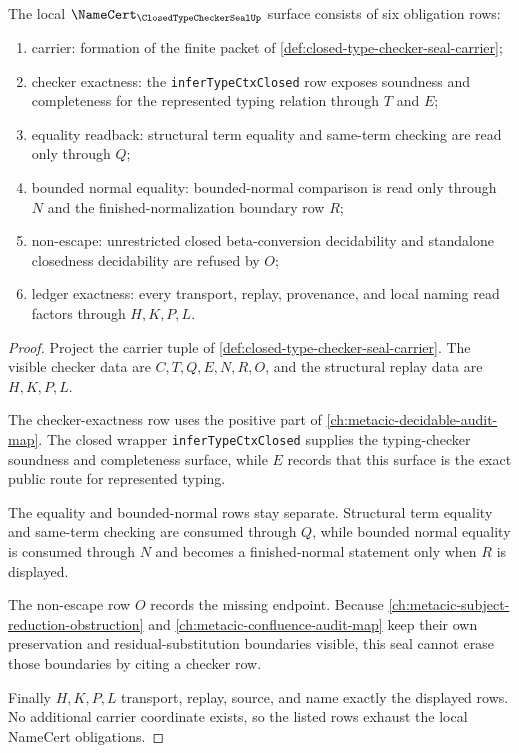 \begin{theorem}
\label{thm:closed-type-checker-seal-namecert-obligations}
The local $\NameCert_{\ClosedTypeCheckerSealUp}$ surface consists of six obligation rows:
\begin{enumerate}
\item carrier: formation of the finite packet of \autoref{def:closed-type-checker-seal-carrier};
\item checker exactness: the \texttt{inferTypeCtxClosed} row exposes soundness and completeness for the represented typing relation through $T$ and $E$;
\item equality readback: structural term equality and same-term checking are read only through $Q$;
\item bounded normal equality: bounded-normal comparison is read only through $N$ and the finished-normalization boundary row $R$;
\item non-escape: unrestricted closed beta-conversion decidability and standalone closedness decidability are refused by $O$;
\item ledger exactness: every transport, replay, provenance, and local naming read factors through $H,K,P,L$.
\end{enumerate}
\end{theorem}
\begin{proof}
Project the carrier tuple of \autoref{def:closed-type-checker-seal-carrier}. The visible checker data are $C,T,Q,E,N,R,O$, and the structural replay data are $H,K,P,L$.

The checker-exactness row uses the positive part of \autoref{ch:metacic-decidable-audit-map}. The closed wrapper \texttt{inferTypeCtxClosed} supplies the typing-checker soundness and completeness surface, while $E$ records that this surface is the exact public route for represented typing.

The equality and bounded-normal rows stay separate. Structural term equality and same-term checking are consumed through $Q$, while bounded normal equality is consumed through $N$ and becomes a finished-normal statement only when $R$ is displayed.

The non-escape row $O$ records the missing endpoint. Because \autoref{ch:metacic-subject-reduction-obstruction} and \autoref{ch:metacic-confluence-audit-map} keep their own preservation and residual-substitution boundaries visible, this seal cannot erase those boundaries by citing a checker row.

Finally $H,K,P,L$ transport, replay, source, and name exactly the displayed rows. No additional carrier coordinate exists, so the listed rows exhaust the local NameCert obligations.
\end{proof}


